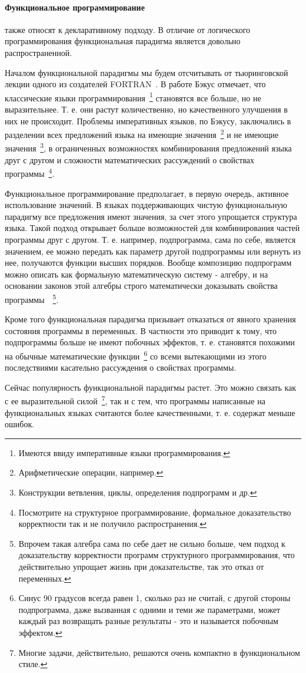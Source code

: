 \paragraph{Функциональное программирование} также относят к декларативному подходу. В отличие от логического программирования функциональная парадигма является довольно распространенной.

Началом функциональной парадигмы мы будем отсчитывать от тьюринговской лекции одного из создателей FORTRAN~\cite{Backus:1978:PLV}. В работе Бэкус отмечает, что классические языки программирования~\footnote{Имеются ввиду императивные языки программирования.} становятся все больше, но не выразительнее. Т. е. они растут количественно, но качественного улучшения в них не происходит. Проблемы императивных языков, по Бэкусу, заключались в разделении всех предложений языка на имеющие значения~\footnote{Арифметические операции, например.} и не имеющие значения~\footnote{Конструкции ветвления, циклы, определения подпрограмм и др.}, в ограниченных возможностях комбинирования предложений языка друг с другом и сложности математических рассуждений о свойствах программы~\footnote{Посмотрите на структурное программирование, формальное доказательство корректности так и не получило распространения.}.

Функциональное программирование предполагает, в первую очередь, активное использование значений. В языках поддерживающих чистую функциональную парадигму все предложения имеют значения, за счет этого упрощается структура языка. Такой подход открывает больше возможностей для комбинирования частей программы друг с другом. Т. е. например, подпрограмма, сама по себе, является значением, ее можно передать как параметр другой подпрограммы или вернуть из нее, получаются функции высших порядков. Вообще композицию подпрограмм можно описать как формальную математическую систему - алгебру, и на основании законов этой алгебры строго математически доказывать свойства программы~\cite{Backus:1978:PLV}~\footnote{Впрочем такая алгебра сама по себе дает не сильно больше, чем подход к доказательству корректности программ структурного программирования, что действительно упрощает жизнь при доказательстве, так это отказ от переменных.}.

Кроме того функциональная парадигма призывает отказаться от явного хранения состояния программы в переменных. В частности это приводит к тому, что подпрограммы больше не имеют побочных эффектов, т. е. становятся похожими на обычные математические функции~\footnote{Синус 90 градусов всегда равен 1, сколько раз не считай, с другой стороны подпрограмма, даже вызванная с одними и теми же параметрами, может каждый раз возвращать разные результаты - это и называется побочным эффектом.} со всеми вытекающими из этого последствиями касательно рассуждения о свойствах программы.

Сейчас популярность функциональной парадигмы растет. Это можно связать как с ее выразительной силой~\footnote{Многие задачи, действительно, решаются очень компактно в функциональном стиле.}, так и с тем, что программы написанные на функциональных языках считаются более качественными, т. е. содержат меньше ошибок.
